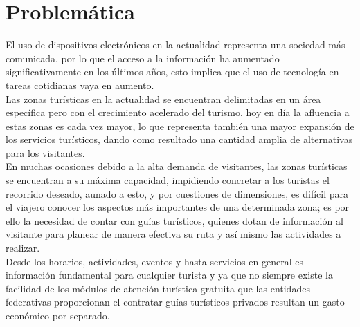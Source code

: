 \section{Problemática}

El uso de dispositivos electrónicos en la actualidad representa una sociedad más comunicada, por lo que el acceso a la información ha aumentado significativamente en los últimos años, esto implica que el uso de tecnología en tareas cotidianas vaya en aumento.\\

Las zonas turísticas en la actualidad se encuentran delimitadas en un área específica pero con el crecimiento acelerado del turismo, hoy en día la afluencia a estas zonas es cada vez mayor, lo que representa también una mayor expansión de los servicios turísticos, dando como resultado una cantidad amplia de alternativas para los visitantes.\\

En muchas ocasiones debido a la alta demanda de visitantes, las zonas turísticas se encuentran a su máxima capacidad, impidiendo concretar a los turistas el recorrido deseado, aunado a esto, y por cuestiones de dimensiones, es difícil para el viajero conocer los aspectos más importantes de una determinada zona; es por ello la necesidad de contar con guías turísticos, quienes dotan de información al visitante para planear de manera efectiva su ruta y así mismo las actividades a realizar.\\

Desde los horarios, actividades, eventos y hasta servicios en general es información fundamental para cualquier turista y ya que no siempre existe la facilidad de los módulos de atención turística gratuita que las entidades federativas proporcionan el contratar guías turísticos privados resultan un gasto económico por separado.
